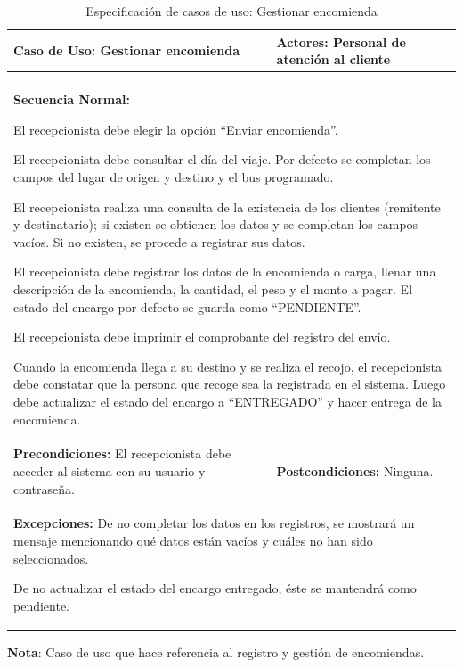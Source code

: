 	\begingroup
	\begin{longtable}{m{7.5cm}|m{7.5cm}}
		\caption[Especificación de casos de uso: Gestionar encomienda]{\newline Especificación de casos de uso: Gestionar encomienda} \label{tab:tabla3_8}\\
		\toprule
		\textbf{Caso de Uso:} Gestionar encomienda & \textbf{Actores:} Personal de atención al cliente \\
		\midrule
		\endfirsthead
		\endhead
		\bottomrule
		\endlastfoot
		\multicolumn{2}{m{15cm}}{\textbf{Descripción:} Este caso de uso hace referencia al registro de las encomiendas.} \\ \hline
		
		\multicolumn{2}{m{15cm}}{\textbf{Secuencia Normal:}
			
			El recepcionista debe elegir la opción “Enviar encomienda”.
			
			El recepcionista debe consultar el día del viaje. Por defecto se completan los campos del lugar de origen y destino y el bus programado.
			
			El recepcionista realiza una consulta de la existencia de los clientes (remitente y destinatario); si existen se obtienen los datos y se completan los campos vacíos. Si no existen, se procede a registrar sus datos.
			
			El recepcionista debe registrar los datos de la encomienda o carga, llenar una descripción de la encomienda, la cantidad, el peso y el monto a pagar. El estado del encargo por defecto se guarda como “PENDIENTE”.
			
			El recepcionista debe imprimir el comprobante del registro del envío.
			
			Cuando la encomienda llega a su destino y se realiza el recojo, el recepcionista debe constatar que la persona que recoge sea la registrada en el sistema. Luego debe actualizar el estado del encargo a “ENTREGADO” y hacer entrega de la encomienda.
		} \\ \hline
		
		\textbf{Precondiciones:} El recepcionista debe acceder al sistema con su usuario y contraseña. & \textbf{Postcondiciones:} Ninguna. \\ \hline
		
		\multicolumn{2}{m{15cm}}{\textbf{Excepciones:} De no completar los datos en los registros, se mostrará un mensaje mencionando qué datos están vacíos y cuáles no han sido seleccionados.
			
		De no actualizar el estado del encargo entregado, éste se mantendrá como pendiente.
		} \\
	\end{longtable}
	\endgroup
	\vspace{-18pt}  %
	\textbf{Nota}: Caso de uso que hace referencia al registro y gestión de encomiendas.
	
